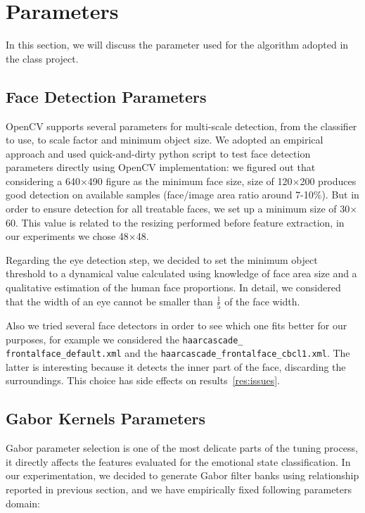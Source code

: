 \section{Parameters}

In this section, we will discuss the parameter used for the algorithm adopted in the class project.

\subsection{Face Detection Parameters}

OpenCV supports several parameters for multi-scale detection, from the classifier to use, to scale factor and minimum object size. We adopted an empirical approach and used quick-and-dirty python script to test face detection parameters directly using OpenCV implementation: we figured out that considering a 640$\times$490 figure as the minimum face size, size of 120$\times$200 produces good detection on available samples (face/image area ratio around 7-10\%).
But in order to ensure detection for all treatable faces, we set up a minimum size of 30$\times$60. This value is related to the resizing performed before feature extraction, in our experiments we chose 48$\times$48.

Regarding the eye detection step, we decided to set the minimum object threshold to a dynamical value calculated using knowledge of face area size and a qualitative estimation of the human face proportions. In detail, we considered that the width of an eye cannot be smaller than $\frac{1}{5}$ of the face width.

Also we tried several face detectors in order to see which one fits better for our purposes, for example we considered the \texttt{haarcascade\_ frontalface\_default.xml} and the \texttt{haarcascade\_frontalface\_cbcl1.xml}. The latter is interesting because it detects the inner part of the face, discarding the surroundings. This choice has side effects on results~\ref{res:issues}.

\subsection{Gabor Kernels Parameters}

Gabor parameter selection is one of the most delicate parts of the tuning process, it directly affects the features evaluated for the emotional state classification.
In our experimentation, we decided to generate Gabor filter banks using relationship reported in previous section, and we have empirically fixed following parameters domain:

